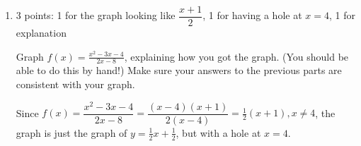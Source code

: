\documentclass{article}
\begin{document}
\begin{enumerate}
\begin{enumerate}
\begin{enumerate}
    \item

      \begin{problem}[\vfill]
        $\displaystyle \lim_{x \rightarrow -1} \frac{x^2 - 3x - 4}{2x - 8}$
      \end{problem}

      \begin{solution}
        \begin{align*}
          \lim_{x \to -1} \frac{x^2 - 3x - 4}{2x - 8} &= \frac{(-1)^2 - 3(-1) - 4}{2(-1)-8}\\
          &= \frac{0}{-10} \\
          &= 0.
        \end{align*}
      \end{solution}

    \item

      \begin{problem}[\vfill]
        $\displaystyle \lim_{x \rightarrow 4} \frac{x^2 - 3x - 4}{2x - 8}$
      \end{problem}

      \begin{solution}
        \begin{align*}
            \lim_{x \to 4} \frac{x^2 - 3x - 4}{2x - 8} 
            &= \lim_{x \to 4} \frac{(x-4)(x+1)}{2(x-4)} \\
          &= \lim_{x \to 4} \frac{x+1}{2} \\
          &= \frac{5}{2}.
        \end{align*}
      \end{solution}
    \end{enumerate}

  \item

    \begin{grading}
      3 points: 1 for the graph looking like $\dfrac{x + 1}{2}$, 1 for having a hole at $x = 4$, 1 for explanation
    \end{grading}

    \begin{problem}[\nstretch{2}]
      Graph $f(x) = \displaystyle \frac{x^2 - 3x - 4}{2x - 8}$, explaining how you got the graph. (You should be able to do this by hand!) Make sure your answers to the previous parts are consistent with your graph.
    \end{problem}

    \begin{solution}
      Since $f(x) = \dfrac{x^2 - 3x - 4}{2x - 8} = \dfrac{(x-4)(x+1)}{2(x-4)}=\frac{1}{2}(x+1), x\neq 4$, the graph is just the graph
       of $y=\frac{1}{2}x + \frac{1}{2}$, but with a hole at $x=4$.
       

\end{solution}
\end{enumerate}
\end{enumerate}
\end{document}
